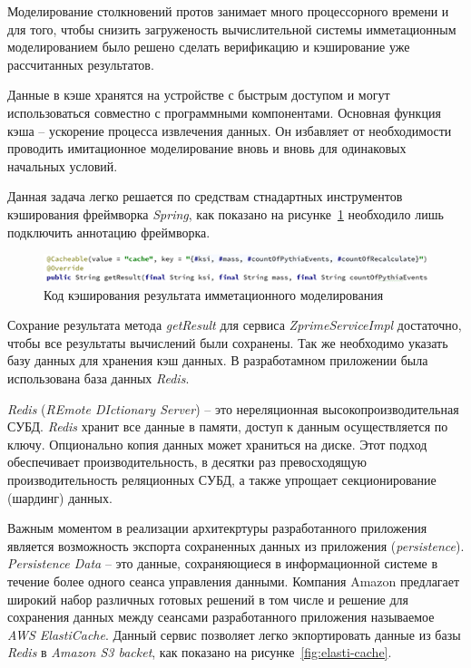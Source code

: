 Моделирование столкновений протов занимает много процессорного времени и для того, чтобы снизить загруженость вычислительной системы имметационным моделированием было решено сделать верификацию и кэширование уже рассчитанных результатов. 

Данные в кэше хранятся на устройстве с быстрым доступом и могут использоваться совместно с программными компонентами. Основная функция кэша – ускорение процесса извлечения данных. Он избавляет от необходимости проводить имитационное моделирование вновь и вновь для одинаковых начальных условий.

Данная задача легко решается по средствам стнадартных инструментов кэширования фреймворка \textit{Spring}, как показано на рисунке~\ref{fig:cache} необходило лишь подключить аннотацию фреймворка.

\begin{figure}[!h]
	\centering
	\includegraphics[width=\textwidth]{figures/cache.png}
	\caption{Код кэширования результата имметационного моделирования}
	\label{fig:cache}
\end{figure}

Сохрание результата метода \textit{getResult} для сервиса \textit{ZprimeServiceImpl} достаточно, чтобы все результаты вычислений были сохранены. Так же необходимо указать базу данных для хранения кэш данных. В разработамном приложении была использована база данных \textit{Redis}.

\textit{Redis} (\textit{REmote DIctionary Server}) -- это нереляционная высокопроизводительная СУБД. \textit{Redis} хранит все данные в памяти, доступ к данным осуществляется по ключу. Опционально копия данных может храниться на диске. Этот подход обеспечивает производительность, в десятки раз превосходящую производительность реляционных СУБД, а также упрощает секционирование (шардинг) данных.

Важным моментом в реализации архитекртуры разработанного приложения является возможность экспорта сохраненных данных из приложения (\textit{persistence}). \textit{Persistence Data} -- это данные, сохраняющиеся в информационной системе в течение более одного сеанса управления данными. Компания Amazon предлагает широкий набор различных готовых решений в том числе и решение для сохранения данных между сеансами разработанного приложения называемое \textit{AWS ElastiCache}. Данный сервис позволяет легко экпортировать данные из базы \textit{Redis} в \textit{Amazon S3 backet}, как показано на рисунке~\ref{fig:elasti-cache}. 

